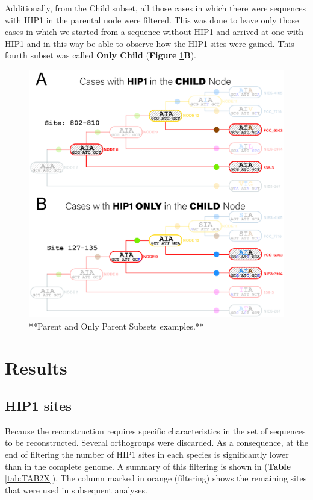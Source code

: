 \documentclass[
]{book}
\begin{document}
Additionally, from the Child subset, all those cases in which there were sequences with HIP1 in the parental node were filtered. This was done to leave only those cases in which we started from a sequence without HIP1 and arrived at one with HIP1 and in this way be able to observe how the HIP1 sites were gained. This fourth subset was called \textbf{Only Child} (\textbf{Figure} \ref{fig:FIG66x}\textbf{B}).

\begin{figure}
\includegraphics[width=1\linewidth]{figures/4x/Node_cases_B} \caption{**Parent and Only Parent Subsets examples.**}\label{fig:FIG66x}
\end{figure}

\hypertarget{results}{%
\chapter{Results}\label{results}}

\hypertarget{hip1-sites-1}{%
\section{HIP1 sites}\label{hip1-sites-1}}

Because the reconstruction requires specific characteristics in the set of sequences to be reconstructed. Several orthogroups were discarded. As a consequence, at the end of filtering the number of HIP1 sites in each species is significantly lower than in the complete genome. A summary of this filtering is shown in (\textbf{Table} \ref{tab:TAB2X}). The column marked in orange (filtering) shows the remaining sites that were used in subsequent analyses.
\end{document}
